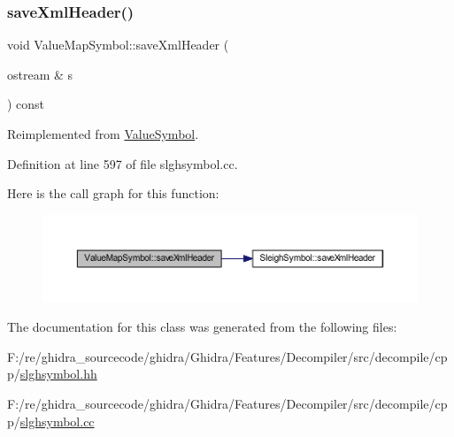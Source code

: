 \subsubsection{\texorpdfstring{saveXmlHeader()}{saveXmlHeader()}}
{\footnotesize\ttfamily void Value\+Map\+Symbol\+::save\+Xml\+Header (\begin{DoxyParamCaption}\item[{ostream \&}]{s }\end{DoxyParamCaption}) const\hspace{0.3cm}{\ttfamily [virtual]}}



Reimplemented from \mbox{\hyperlink{class_value_symbol_a7b1c84bd9d7e84f9272d448d10c31200}{Value\+Symbol}}.



Definition at line 597 of file slghsymbol.\+cc.

Here is the call graph for this function\+:
\nopagebreak
\begin{figure}[H]
\begin{center}
\leavevmode
\includegraphics[width=350pt]{class_value_map_symbol_a11fcdd4ed7bb9ede9c5bb407436b85bf_cgraph}
\end{center}
\end{figure}


The documentation for this class was generated from the following files\+:\begin{DoxyCompactItemize}
\item 
F\+:/re/ghidra\+\_\+sourcecode/ghidra/\+Ghidra/\+Features/\+Decompiler/src/decompile/cpp/\mbox{\hyperlink{slghsymbol_8hh}{slghsymbol.\+hh}}\item 
F\+:/re/ghidra\+\_\+sourcecode/ghidra/\+Ghidra/\+Features/\+Decompiler/src/decompile/cpp/\mbox{\hyperlink{slghsymbol_8cc}{slghsymbol.\+cc}}\end{DoxyCompactItemize}
